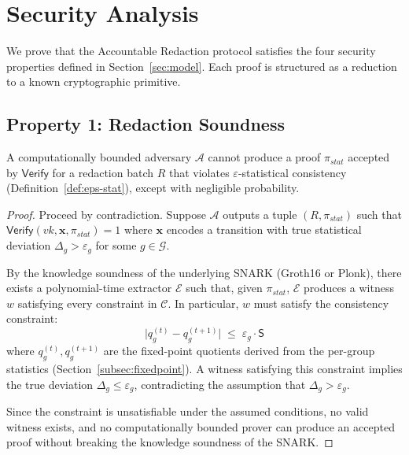 \section{Security Analysis}
\label{sec:security}

We prove that the Accountable Redaction protocol satisfies the four
security properties defined in Section~\ref{sec:model}. Each proof is
structured as a reduction to a known cryptographic primitive.

\subsection{Property 1: Redaction Soundness}
\label{subsec:soundness}

\begin{theorem}
  A computationally bounded adversary $\mathcal{A}$ cannot produce a
  proof $\pi_{\mathit{stat}}$ accepted by $\mathsf{Verify}$ for a
  redaction batch $R$ that violates $\varepsilon$-statistical consistency
  (Definition~\ref{def:eps-stat}), except with negligible probability.
\end{theorem}

\begin{proof}
Proceed by contradiction. Suppose $\mathcal{A}$ outputs a tuple
$(R, \pi_{\mathit{stat}})$ such that $\mathsf{Verify}(\mathit{vk},
\mathbf{x}, \pi_{\mathit{stat}}) = 1$ where $\mathbf{x}$ encodes a
transition with true statistical deviation $\Delta_g > \varepsilon_g$ for
some $g \in \mathcal{G}$.

By the knowledge soundness of the underlying SNARK (Groth16 or Plonk),
there exists a polynomial-time extractor $\mathcal{E}$ such that, given
$\pi_{\mathit{stat}}$, $\mathcal{E}$ produces a witness $w$ satisfying
every constraint in $\mathcal{C}$. In particular, $w$ must satisfy the
consistency constraint:
\[
  \bigl| q_g^{(t)} - q_g^{(t+1)} \bigr| \;\leq\; \varepsilon_g \cdot
  \mathsf{S}
\]
where $q_g^{(t)}, q_g^{(t+1)}$ are the fixed-point quotients derived
from the per-group statistics (Section~\ref{subsec:fixedpoint}). A
witness satisfying this constraint implies the true deviation $\Delta_g
\leq \varepsilon_g$, contradicting the assumption that $\Delta_g >
\varepsilon_g$.

Since the constraint is unsatisfiable under the assumed conditions, no
valid witness exists, and no computationally bounded prover can produce an
accepted proof without breaking the knowledge soundness of the SNARK.
\end{proof}

